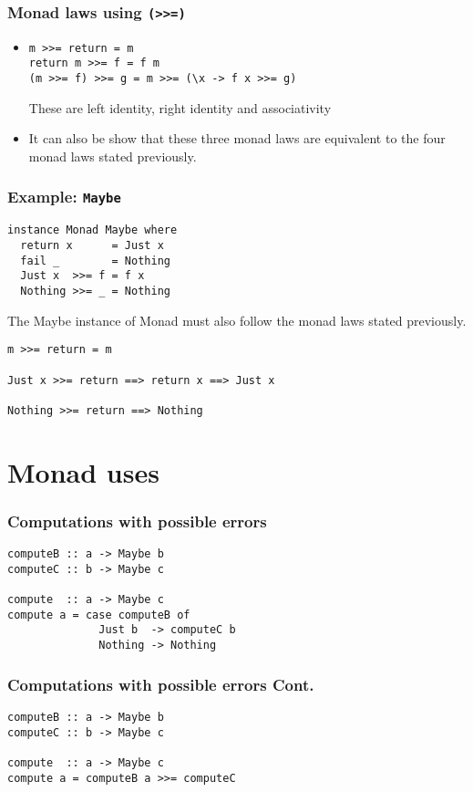 \documentclass{beamer} %
\begin{document}
\begin{frame}[fragile]\frametitle{Monad laws using \texttt{(>>=)}}
  \begin{itemize}
    \item
\begin{verbatim}
m >>= return = m
return m >>= f = f m
(m >>= f) >>= g = m >>= (\x -> f x >>= g)
\end{verbatim}
These are left identity, right identity and associativity
  \item It can also be show that these three monad laws are equivalent to the four monad laws
    stated previously.
\end{itemize}
\end{frame}

\begin{frame}[fragile]\frametitle{Example: \texttt{Maybe}}
\begin{verbatim}
instance Monad Maybe where
  return x      = Just x
  fail _        = Nothing
  Just x  >>= f = f x
  Nothing >>= _ = Nothing
\end{verbatim}
The Maybe instance of Monad must also follow the monad laws stated previously.
\begin{verbatim}
m >>= return = m

Just x >>= return ==> return x ==> Just x

Nothing >>= return ==> Nothing
\end{verbatim}
\end{frame}

\section{Monad uses}

\begin{frame}[fragile]\frametitle{Computations with possible errors}
\begin{verbatim}
computeB :: a -> Maybe b
computeC :: b -> Maybe c

compute  :: a -> Maybe c
compute a = case computeB of
              Just b  -> computeC b
              Nothing -> Nothing
\end{verbatim}
\end{frame}

\begin{frame}[fragile]\frametitle{Computations with possible errors Cont.}
\begin{verbatim}
computeB :: a -> Maybe b
computeC :: b -> Maybe c

compute  :: a -> Maybe c
compute a = computeB a >>= computeC
\end{verbatim}
\end{frame}
\end{document}
